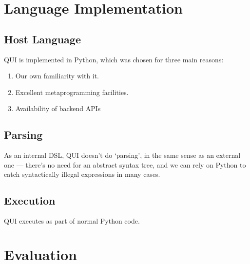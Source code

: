 \documentclass{article} %
\begin{document}
\section{Language Implementation}
\subsection{Host Language}
QUI is implemented in Python, which was chosen for three main reasons:
\begin{enumerate}
\item Our own familiarity with it.
\item Excellent metaprogramming facilities.
\item Availability of backend APIs
\end{enumerate}
\subsection{Parsing}
As an internal DSL, QUI doesn't do `parsing', in the same sense as an external one --- there's no need for an abstract syntax tree, and we can rely on Python to catch syntactically 
illegal expressions in many cases.
\subsection{Execution}
QUI executes as part of normal Python code.
\section{Evaluation}
\end{document}
